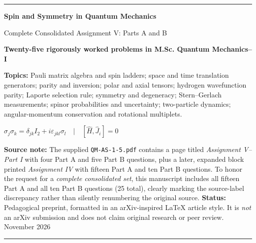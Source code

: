 \documentclass[11pt,a4paper]{article}
\theoremstyle{definition}
\begin{document}
\begin{titlepage}
\thispagestyle{empty}
\vspace*{18mm}
{\color{blue}\rule{\textwidth}{1.7pt}}\par\vspace{11mm}
{\LARGE\sffamily\bfseries Spin and Symmetry in Quantum Mechanics\par}
\vspace{5mm}
{\Large\sffamily Complete Consolidated Assignment V: Parts A and B\par}
\vspace{10mm}
{\large\bfseries Twenty-five rigorously worked problems in M.Sc. Quantum Mechanics--I\par}
\vspace{12mm}
\noindent\textbf{Topics:} Pauli matrix algebra and spin ladders; space and time translation generators; parity and inversion; polar and axial tensors; hydrogen wavefunction parity; Laporte selection rule; symmetry and degeneracy; Stern--Gerlach measurements; spinor probabilities and uncertainty; two-particle dynamics; angular-momentum conservation and rotational multiplets.
\vspace{12mm}
\begin{center}
\vspace{3mm}
{\large\color{blue}\(\displaystyle\sigma_j\sigma_k=\delta_{jk}I_2+i\varepsilon_{jkl}\sigma_l\quad\vert\quad[\hat H,\hat J_i]=0\)}
\vspace{3mm}
\end{center}
\vfill
\noindent\textbf{Source note:} The supplied \texttt{QM-AS-1-5.pdf} contains a page titled \emph{Assignment V--Part I} with four Part A and five Part B questions, plus a later, expanded block printed \emph{Assignment IV} with fifteen Part A and ten Part B questions. To honor the request for a \emph{complete consolidated set}, this manuscript includes all fifteen Part A and all ten Part B questions (25 total), clearly marking the source-label discrepancy rather than silently renumbering the original source.
\vspace{8mm}
\noindent\textbf{Status:} Pedagogical preprint, formatted in an arXiv-inspired \LaTeX{} article style. It is \emph{not} an arXiv submission and does not claim original research or peer review.
\vspace{9mm}
\noindent November 2026\par\vspace{6mm}
{\color{blue}\rule{\textwidth}{1.7pt}}
\end{titlepage}
\end{document}
